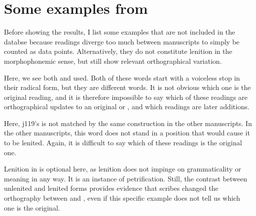 \section{Some examples from }
\label{sec:some-examples-from}
Before showing the results, I list some examples that are not included in the databse because readings diverge too much between manuscripts to simply be counted as data points. Alternatively, they do not constitute lenition in the morphophonemic sense, but still show relevant orthographical variation. 
\begin{mwl}
\end{mwl}
Here, we see both  and  used. Both of these words start with a voiceless stop in their radical form, but they are different words. It is not obvious which one is the original reading, and it is therefore impossible to say which of these readings are orthographical updates to an original  or , and which readings are later additions.

\begin{mwl}
\end{mwl}
Here, \gls{j119}'s  is not matched by the same construction in the other manuscripts. In the other manuscripts, this word does not stand in a position that would cause it to be lenited. Again, it is difficult to say which of these readings is the original one.

\begin{mwl}
\end{mwl}
Lenition in  is optional here, as lenition does not impinge on grammaticality or meaning in any way. It is an instance of petrification. Still, the contrast between unlenited and lenited forms provides evidence that scribes changed the orthography between  and , even if this specific example does not tell us which one is the original.

